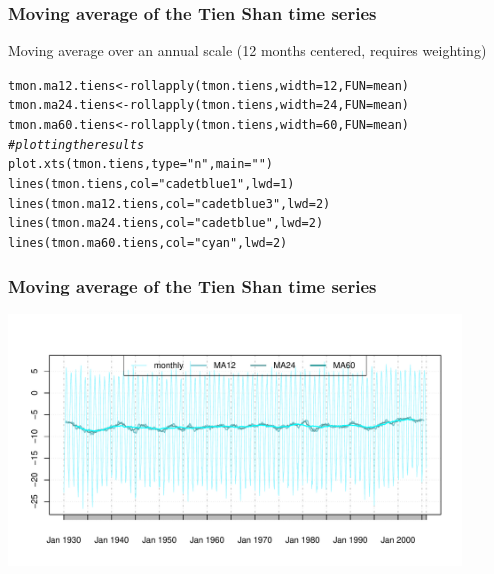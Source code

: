\documentclass[xcolor=table, xcolor=dvipsnames]{beamer}\usepackage[]{graphicx}\usepackage[]{color}
\makeatletter
\newcommand{\hlnum}[1]{\textcolor[rgb]{0,0,0}{#1}}
\newcommand{\hlstr}[1]{\textcolor[rgb]{0.545,0.137,0.137}{#1}}
\newcommand{\hlcom}[1]{\textcolor[rgb]{0,0.392,0}{\textit{#1}}}
\newcommand{\hlstd}[1]{\textcolor[rgb]{0,0,0}{#1}}
\newcommand{\hlkwb}[1]{\textcolor[rgb]{0,0,0}{#1}}
\newcommand{\hlkwc}[1]{\textcolor[rgb]{1,0,1}{#1}}
\newcommand{\hlkwd}[1]{\textcolor[rgb]{0,0,1}{#1}}
\newenvironment{kframe}{%
 \def\at@end@of@kframe{}%
 \ifinner\ifhmode%
  \def\at@end@of@kframe{\end{minipage}}%
  \begin{minipage}{\columnwidth}%
 \fi\fi%
 \def\FrameCommand##1{\hskip\@totalleftmargin \hskip-\fboxsep
 \colorbox{shadecolor}{##1}\hskip-\fboxsep
     \hskip-\linewidth \hskip-\@totalleftmargin \hskip\columnwidth}%
 \MakeFramed {\advance\hsize-\width
   \@totalleftmargin\z@ \linewidth\hsize
   \@setminipage}}%
 {\par\unskip\endMakeFramed%
 \at@end@of@kframe}
\newenvironment{knitrout}{}{} %
\makeatother
\begin{document}
\begin{frame}[fragile]\frametitle{Moving average of the Tien Shan time series}
Moving average over an annual scale (12 months centered, requires weighting)
\begin{knitrout}\small
{}\color{fgcolor}\begin{kframe}
\begin{alltt}
\hlstd{tmon.ma12.tiens} \hlkwb{<-} \hlkwd{rollapply}\hlstd{(tmon.tiens,} \hlkwc{width}\hlstd{=}\hlnum{12}\hlstd{,} \hlkwc{FUN}\hlstd{=mean)}
\hlstd{tmon.ma24.tiens} \hlkwb{<-} \hlkwd{rollapply}\hlstd{(tmon.tiens,} \hlkwc{width}\hlstd{=}\hlnum{24}\hlstd{,} \hlkwc{FUN}\hlstd{=mean)}
\hlstd{tmon.ma60.tiens} \hlkwb{<-} \hlkwd{rollapply}\hlstd{(tmon.tiens,} \hlkwc{width}\hlstd{=}\hlnum{60}\hlstd{,} \hlkwc{FUN}\hlstd{=mean)}
\hlcom{# plotting the results}
\hlkwd{plot.xts}\hlstd{(tmon.tiens,} \hlkwc{type}\hlstd{=}\hlstr{"n"}\hlstd{,} \hlkwc{main}\hlstd{=}\hlstr{""}\hlstd{)}
\hlkwd{lines}\hlstd{(tmon.tiens,} \hlkwc{col}\hlstd{=}\hlstr{"cadetblue1"}\hlstd{,} \hlkwc{lwd}\hlstd{=}\hlnum{1}\hlstd{)}
\hlkwd{lines}\hlstd{(tmon.ma12.tiens,} \hlkwc{col}\hlstd{=}\hlstr{"cadetblue3"}\hlstd{,} \hlkwc{lwd}\hlstd{=}\hlnum{2}\hlstd{)}
\hlkwd{lines}\hlstd{(tmon.ma24.tiens,} \hlkwc{col}\hlstd{=}\hlstr{"cadetblue"}\hlstd{,} \hlkwc{lwd}\hlstd{=}\hlnum{2}\hlstd{)}
\hlkwd{lines}\hlstd{(tmon.ma60.tiens,} \hlkwc{col}\hlstd{=}\hlstr{"cyan"}\hlstd{,} \hlkwc{lwd}\hlstd{=}\hlnum{2}\hlstd{)}
\end{alltt}
\end{kframe}
\end{knitrout}
\end{frame}





\begin{frame}[fragile]\frametitle{Moving average of the Tien Shan time series}
\includegraphics[width=0.9\textwidth]{./externalfig/tiens_ma.pdf}
\end{frame}
\end{document}

